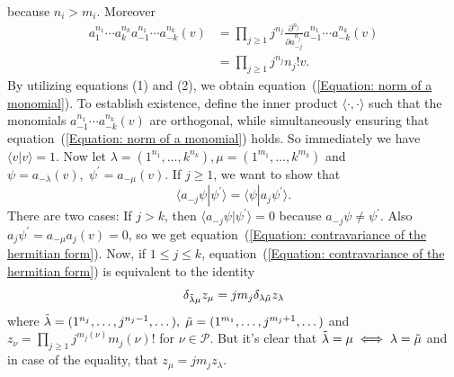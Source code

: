 because $n_i>m_i$. Moreover
\begin{equation}
\begin{split}
   a_{1}^{n_1}\cdots a_{k}^{n_k}  a_{-1}^{n_1}\cdots a_{-k}^{n_k}(v)&=\prod_{j\geq1}j^{n_j}\frac{\partial^{n_j}}{\partial a_{-j}^{n_j}}a_{-1}^{n_1}\cdots a_{-k}^{n_k}(v)\\
   &=\prod_{j\geq1}j^{n_j}n_j! v.
\end{split}
\end{equation}
 By utilizing equations (1) and (2), we obtain equation~(\ref{Equation: norm of a monomial}). To establish existence, define the inner product $\langle \cdot, \cdot \rangle$ such that the monomials $a_{-1}^{n_1} \cdots a_{-k}^{n_k}(v)$ are orthogonal, while simultaneously ensuring that equation~(\ref{Equation: norm of a monomial}) holds. So immediately we have $\langle v|v\rangle =1$. Now let $\lambda = (1^{n_1},\dots, k^{n_k}),\mu =(1^{m_1},\dots, k^{m_k})$ and $\psi=a_{-\lambda}(v),\;\psi^\prime = a_{-\mu}(v)$. If $j\geq 1$, we want to show that
 \begin{equation}\label{Equation: contravariance of the hermitian form}
     \langle a_{-j}\psi|\psi^\prime\rangle = \langle\psi|a_j\psi^\prime\rangle.
 \end{equation}
 There are two cases: If $j>k$, then $ \langle a_{-j}\psi|\psi^\prime\rangle=0$ because $a_{-j}\psi\neq \psi^\prime$. Also $a_j\psi^\prime=a_{-\mu}a_j(v)=0$, so we get equation~(\ref{Equation: contravariance of the hermitian form}). Now, if $1\leq j\leq k$, equation~(\ref{Equation: contravariance of the hermitian form}) is equivalent to the identity
 \begin{equation}
     \delta_{\Tilde{\lambda}\mu}z_\mu=jm_j\delta_{\lambda\Tilde{\mu}}z_\lambda
 \end{equation}
where $\Tilde{\lambda}=(1^{n_j},\dots,j^{n_j-1},\dots),\;\Tilde{\mu}=(1^{m_1},\dots,j^{m_j+1},\dots)$ and $z_\nu=\prod_{j\geq1}j^{m_j(\nu)}m_j(\nu)!$ for $\nu\in\mathcal{P}$. But it's clear that $\Tilde{\lambda}=\mu\iff \lambda=\Tilde{\mu}$ and in case of the equality, that $z_\mu=jm_jz_\lambda$.


 
